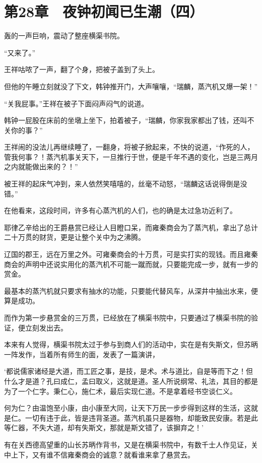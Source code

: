 \section{第28章　夜钟初闻已生潮（四）}

轰的一声巨响，震动了整座横渠书院。

“又来了。”

王祥咕哝了一声，翻了个身，把被子盖到了头上。

但他的午睡立刻就没了下文，韩钟推开门，大声嚷嚷，“瑞麟，蒸汽机又爆一架！”

“关我屁事。”王祥在被子下面闷声闷气的说道。

韩钟一屁股在床前的坐墩上坐下，拍着被子，“瑞麟，你家我家都出了钱，还叫不关你的事？”

王祥闹的没法儿再继续睡了，一翻身，将被子掀起来，不快的说道，“作死的人，管我何事？！蒸汽机事关天下，一旦推行于世，便是千年不遇的变化，岂是三两月之内就能做出来的？！”

被王祥的起床气冲到，来人依然笑嘻嘻的，丝毫不动怒，“瑞麟这话说得倒是没错。”

在他看来，这段时间，许多有心蒸汽机的人们，也的确是太过急功近利了。

耶律乙辛给出的王爵悬赏已经让人目瞪口呆，而雍秦商会为了蒸汽机，拿出了总计二十万贯的财货，更是让整个关中为之沸腾。

辽国的郡王，远在万里之外。可雍秦商会的十万贯，可是实打实的现钱。而且雍秦商会的声明中还说实用化的蒸汽机不可能一蹴而就，只要能完成一步，就有一步的赏金。

最基本的蒸汽机就只要求有抽水的功能，只要能代替风车，从深井中抽出水来，便算是成功。

而作为第一步悬赏金的三万贯，已经放在了横渠书院中，只要通过了横渠书院的验证，便立刻发出去。

本来有人觉得，横渠书院太过于参与到商人们的活动中，实在是有失斯文，但苏昞一阵发作，当着所有师生的面，发表了一篇演讲，

‘都说儒家诸经是大道，而工匠之事，是技，是术。术与道比，自是等而下之！但什么才是道？孔曰成仁，孟曰取义，这就是道。圣人所说纲常、礼法，其目的都是为了一个仁字。秉仁心，施仁术，最后实现仁道。不是拿着经书空谈仁义。

何为仁？由温饱至小康，由小康至大同，让天下万民一步步得到这样的生活，这就是仁。一切有违于此，皆是违背圣道。蒸汽机虽只是器物，却能致民安康。若是此等仁器，不失大道，却有失斯文，那就是斯文错了，该摒弃之！’

有在关西德高望重的山长苏昞作背书，又是在横渠书院中，有数千士人作见证，关中上下，又有谁不信雍秦商会的诚意？就看谁来拿了悬赏去。

